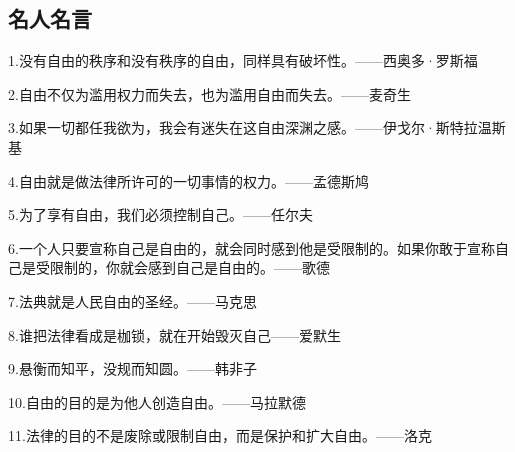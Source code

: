 \documentclass[UTF8]{ctexart}
\begin{document}
\subsection{名人名言}
1.没有自由的秩序和没有秩序的自由，同样具有破坏性。——西奥多·罗斯福\par
2.自由不仅为滥用权力而失去，也为滥用自由而失去。——麦奇生\par
3.如果一切都任我欲为，我会有迷失在这自由深渊之感。——伊戈尔·斯特拉温斯基\par
4.自由就是做法律所许可的一切事情的权力。——孟德斯鸠\par
5.为了享有自由，我们必须控制自己。——任尔夫\par
6.一个人只要宣称自己是自由的，就会同时感到他是受限制的。如果你敢于宣称自己是受限制的，你就会感到自己是自由的。——歌德\par
7.法典就是人民自由的圣经。——马克思\par
8.谁把法律看成是枷锁，就在开始毁灭自己——爱默生\par
9.悬衡而知平，没规而知圆。——韩非子\par
10.自由的目的是为他人创造自由。——马拉默德\par
11.法律的目的不是废除或限制自由，而是保护和扩大自由。——洛克\par
\end{document}
